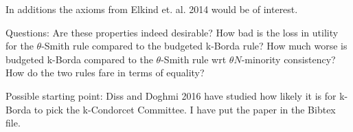 \documentclass[10pt,a4paper]{article}
\begin{document}
In additions the axioms from Elkind et. al. 2014 would be of interest.

Questions: Are these properties indeed desirable? How bad is the loss in utility for the $\theta$-Smith rule compared to the budgeted k-Borda
rule? How much worse is budgeted k-Borda compared to the $\theta$-Smith rule wrt $\theta N$-minority consistency? How do the two rules fare in
terms of equality?

Possible starting point: Diss and Doghmi 2016 have studied how likely it is for k-Borda to pick the k-Condorcet Committee. I have put the paper
in the Bibtex file.
\end{document}
